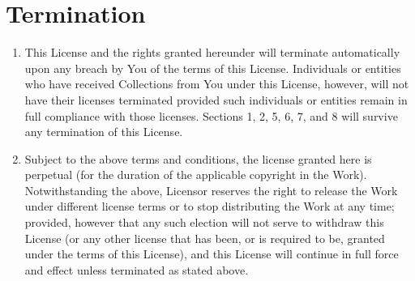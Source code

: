 \section{Termination}
\begin{enumerate}
 \item This License and the rights granted hereunder will terminate
       automatically upon any breach by You of the terms of this
       License. Individuals or entities who have received Collections
       from You under this License, however, will not have their
       licenses terminated provided such individuals or entities remain
       in full compliance with those licenses. Sections 1, 2, 5, 6, 7,
       and 8 will survive any termination of this License.
 \item Subject to the above terms and conditions, the license granted
       here is perpetual (for the duration of the applicable copyright
       in the Work). Notwithstanding the above, Licensor reserves the
       right to release the Work under different license terms or to
       stop distributing the Work at any time; provided, however that
       any such election will not serve to withdraw this License (or any
       other license that has been, or is required to be, granted under
       the terms of this License), and this License will continue in
       full force and effect unless terminated as stated above.
\end{enumerate}


